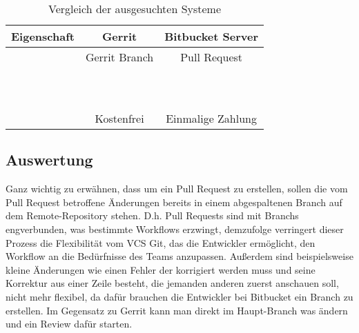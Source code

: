 \begin{table}[h]
	\caption[Vergleichstabelle der ausgesuchten Systeme]{Vergleich der ausgesuchten Systeme}
	\centering
	\begin{tabular}{|c||c|c|}
			\hline 
			Eigenschaft & \textbf{Gerrit} & \textbf{Bitbucket Server} \\ 
			\hline 
			\textbf{\color{blue}{Review Workflow}} & Gerrit Branch & Pull Request \\ 
			\hline 
			\textbf{\color{blue}{Inline Diffs}} & \color{green}{\ja} & \color{green}{\ja} \\ 
			\hline 
			\textbf{\color{blue}{side by side Diffs}} & \color{green}{\ja} & \color{green}{\ja} \\ 
			\hline 
			\textbf{\color{blue}{Zugriffskontrolle auf Repo.}} & \color{green}{\ja} & \color{green}{\ja} \\ 
			\hline 
			\textbf{\color{blue}{Zugriffskontrolle auf den Reviews}} & \color{green}{\ja} & \color{green}{\ja} \\ 
			\hline 
			\textbf{\color{blue}{Vorschläge annehmen}} & \color{green}{\ja} & \color{green}{\ja} \\ 
			\hline 
			\textbf{\color{blue}{Patchsets}} & \color{green}{\ja} & \color{red}{\nein} \\ 
			\hline 
			\textbf{\color{blue}{E-Mail Benachrichtigungen}} & \color{green}{\ja} & \color{green}{\ja} \\ 
			\hline 
			\textbf{\color{blue}{Task-Liste}} & \color{red}{\nein} & \color{green}{\ja} \\
			\hline 
			\textbf{\color{blue}{Direkt Forken}} & \color{red}{\nein} & \color{green}{\ja} \\
			\hline 
			\textbf{\color{blue}{Diffs zwischen Commits/Tags/Branchs}} & \color{red}{\nein} & \color{green}{\ja} \\
			\hline 
			\textbf{\color{blue}{Kosten}} & Kostenfrei & Einmalige Zahlung \\
			\hline 
	\end{tabular} 
	\label{table:Vergleichstabelle Gerrit & Bitbucket}
\end{table}

\subsection{Auswertung}
\label{subsec:Auswertung}

Ganz wichtig zu erwähnen, dass um ein Pull Request zu erstellen, sollen die vom Pull Request betroffene Änderungen bereits in einem abgespaltenen Branch auf dem Remote-Repository stehen. D.h. Pull Requests sind mit Branchs engverbunden, was bestimmte Workflows erzwingt, demzufolge verringert dieser Prozess die Flexibilität vom \ac{VCS} Git, das die Entwickler ermöglicht, den Workflow an die Bedürfnisse des Teams anzupassen. Außerdem sind beispielsweise kleine Änderungen wie einen Fehler der korrigiert werden muss und seine Korrektur aus einer Zeile besteht, die jemanden anderen zuerst anschauen soll, nicht mehr flexibel, da dafür brauchen die Entwickler bei Bitbucket ein Branch zu erstellen. Im Gegensatz zu Gerrit kann man direkt im Haupt-Branch was ändern und ein Review dafür starten.

